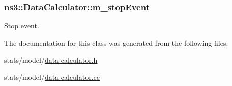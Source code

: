\subsubsection[{\texorpdfstring{m\+\_\+stop\+Event}{m_stopEvent}}]{ ns3\+::\+Data\+Calculator\+::m\+\_\+stop\+Event\hspace{0.3cm}{\ttfamily [private]}}\hypertarget{classns3_1_1DataCalculator_a97311a7f2fdfb11f13e440e12df73e74}{}\label{classns3_1_1DataCalculator_a97311a7f2fdfb11f13e440e12df73e74}


Stop event. 



The documentation for this class was generated from the following files\+:\begin{DoxyCompactItemize}
\item 
stats/model/\hyperlink{data-calculator_8h}{data-\/calculator.\+h}\item 
stats/model/\hyperlink{data-calculator_8cc}{data-\/calculator.\+cc}\end{DoxyCompactItemize}

